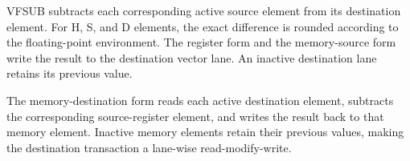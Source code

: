 VFSUB subtracts each corresponding active source element from its destination
element. For H, S, and D elements, the exact difference is rounded according
to the floating-point environment. The register form and the memory-source
form write the result to the destination vector lane. An inactive destination
lane retains its previous value.

The memory-destination form reads each active destination element, subtracts
the corresponding source-register element, and writes the result back to that
memory element. Inactive memory elements retain their previous values, making
the destination transaction a lane-wise read-modify-write.
